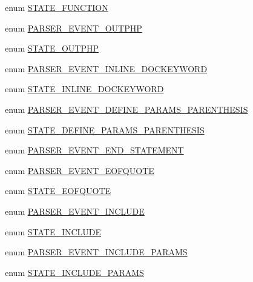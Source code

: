 \begin{DoxyCompactItemize}
enum \hyperlink{_parser_8inc_ad400f7a5b6c53bdd37bd9ccfe4dd7c9f}{\-S\-T\-A\-T\-E\-\_\-\-F\-U\-N\-C\-T\-I\-O\-N} 
\item 
enum \hyperlink{_parser_8inc_adb0a60fa0fda5e895b22f878e2ea376c}{\-P\-A\-R\-S\-E\-R\-\_\-\-E\-V\-E\-N\-T\-\_\-\-O\-U\-T\-P\-H\-P} 
\item 
enum \hyperlink{_parser_8inc_a39c01f0afdf4a08c88b90c59f3b6e6c4}{\-S\-T\-A\-T\-E\-\_\-\-O\-U\-T\-P\-H\-P} 
\item 
enum \hyperlink{_parser_8inc_a2f35348a03548327085ae7d56a2c7ddc}{\-P\-A\-R\-S\-E\-R\-\_\-\-E\-V\-E\-N\-T\-\_\-\-I\-N\-L\-I\-N\-E\-\_\-\-D\-O\-C\-K\-E\-Y\-W\-O\-R\-D} 
\item 
enum \hyperlink{_parser_8inc_a1911ada0c804d4a4406180666fc619d4}{\-S\-T\-A\-T\-E\-\_\-\-I\-N\-L\-I\-N\-E\-\_\-\-D\-O\-C\-K\-E\-Y\-W\-O\-R\-D} 
\item 
enum \hyperlink{_parser_8inc_a8efad3c6b415e1c9a8660de0b6d9e7a9}{\-P\-A\-R\-S\-E\-R\-\_\-\-E\-V\-E\-N\-T\-\_\-\-D\-E\-F\-I\-N\-E\-\_\-\-P\-A\-R\-A\-M\-S\-\_\-\-P\-A\-R\-E\-N\-T\-H\-E\-S\-I\-S} 
\item 
enum \hyperlink{_parser_8inc_ad83e17d31c4255cf152071496e81f284}{\-S\-T\-A\-T\-E\-\_\-\-D\-E\-F\-I\-N\-E\-\_\-\-P\-A\-R\-A\-M\-S\-\_\-\-P\-A\-R\-E\-N\-T\-H\-E\-S\-I\-S} 
\item 
enum \hyperlink{_parser_8inc_ad918095ef70e33e2ae6d874e062721ab}{\-P\-A\-R\-S\-E\-R\-\_\-\-E\-V\-E\-N\-T\-\_\-\-E\-N\-D\-\_\-\-S\-T\-A\-T\-E\-M\-E\-N\-T} 
\item 
enum \hyperlink{_parser_8inc_aa96d2aa9843cad5ecee2c66cda7a1288}{\-P\-A\-R\-S\-E\-R\-\_\-\-E\-V\-E\-N\-T\-\_\-\-E\-O\-F\-Q\-U\-O\-T\-E} 
\item 
enum \hyperlink{_parser_8inc_a577b022d12e07dc7ffee464541118a17}{\-S\-T\-A\-T\-E\-\_\-\-E\-O\-F\-Q\-U\-O\-T\-E} 
\item 
enum \hyperlink{_parser_8inc_a2bf652bf5148e8555c7caa56c4e960bf}{\-P\-A\-R\-S\-E\-R\-\_\-\-E\-V\-E\-N\-T\-\_\-\-I\-N\-C\-L\-U\-D\-E} 
\item 
enum \hyperlink{_parser_8inc_a242cd4c359096b9f088a5322f6b13694}{\-S\-T\-A\-T\-E\-\_\-\-I\-N\-C\-L\-U\-D\-E} 
\item 
enum \hyperlink{_parser_8inc_a4332dc2cadb963483f147c65b8158ce0}{\-P\-A\-R\-S\-E\-R\-\_\-\-E\-V\-E\-N\-T\-\_\-\-I\-N\-C\-L\-U\-D\-E\-\_\-\-P\-A\-R\-A\-M\-S} 
\item 
enum \hyperlink{_parser_8inc_afd991e53cfd8f9f331df855c43ebf316}{\-S\-T\-A\-T\-E\-\_\-\-I\-N\-C\-L\-U\-D\-E\-\_\-\-P\-A\-R\-A\-M\-S} 
\item 

\end{DoxyCompactItemize}
